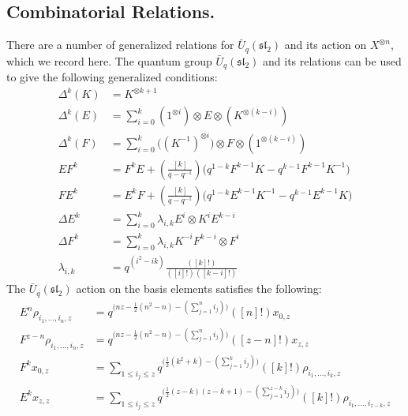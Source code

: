 \documentclass[]{article}
\begin{document}
\begin{appendices}
\section{Combinatorial Relations.}
There are a number of generalized relations for $\bar{U}_{q}(\mathfrak{sl}_{2})$ and its action on $X^{\otimes n}$, which we record here. The quantum group $\bar{U}_{q}(\mathfrak{sl}_{2})$ and its relations can be used to give the following generalized conditions:
\begin{align}
\Delta^{k}(K)&=K^{\otimes k+1} \label{eq:A1}\\
\Delta^{k}(E)&=\sum\limits_{i=0}^{k}(1^{\otimes i})\otimes E\otimes (K^{\otimes (k-i)}) \label{eq:A2}\\
\Delta^{k}(F)&=\sum\limits_{i=0}^{k}\big((K^{-1})^{\otimes i}\big)\otimes F\otimes(1^{\otimes (k-i)}) \label{eq:A3}\\
EF^{k}&=F^{k}E+(\frac{[k]}{q-q^{-1}})\big(q^{1-k}F^{k-1}K-q^{k-1}F^{k-1}K^{-1}\big) \label{eq:A4}\\
FE^{k}&=E^{k}F+(\frac{[k]}{q-q^{-1}})\big(q^{1-k}E^{k-1}K^{-1}-q^{k-1}E^{k-1}K\big) \label{eq:A5}\\
\Delta E^{k}&=\sum\limits_{i=0}^{k}\lambda_{i,k}E^{i}\otimes K^{i}E^{k-i} \label{eq:A6}\\
\Delta F^{k}&=\sum\limits_{i=0}^{k}\lambda_{i,k}K^{-i}F^{k-i}\otimes F^{i} \label{eq:A7}\\
\lambda_{i,k}&=q^{(i^{2}-ik)}\frac{([k]!)}{([i]!)([k-i]!)} \label{eq:A8}
\end{align}
The $\bar{U}_{q}(\mathfrak{sl}_{2})$ action on the basis elements satisfies the following:
\begin{align}
E^{n}\rho_{i_{1},...,i_{n},z}&=q^{\big(nz-\frac{1}{2}(n^{2}-n)-(\sum\limits_{j=1}^{n}i_{j})\big)}([n]!)x_{0,z} \label{eq:A9}\\
F^{z-n}\rho_{i_{1},...,i_{n},z}&=q^{\big(nz-\frac{1}{2}(n^{2}-n)-(\sum\limits_{j=1}^{n}i_{j})\big)}([z-n]!)x_{z,z} \label{eq:A10}\\
F^{k}x_{0,z}&=\sum\limits_{1\leq i_{j}\leq z}q^{\big(\frac{1}{2}(k^{2}+k)-(\sum\limits_{j=1}^{k}i_{j})\big)}([k]!)\rho_{i_{1},...,i_{k},z} \label{eq:A11}\\
E^{k}x_{z,z}&=\sum\limits_{1\leq i_{j}\leq z}q^{\big(\frac{1}{2}(z-k)(z-k+1)-(\sum\limits_{j=1}^{z-k}i_{j})\big)}([k]!)\rho_{i_{1},...,i_{z-k},z} \label{eq:A12}\\

\end{align}
\end{appendices}
\end{document}
